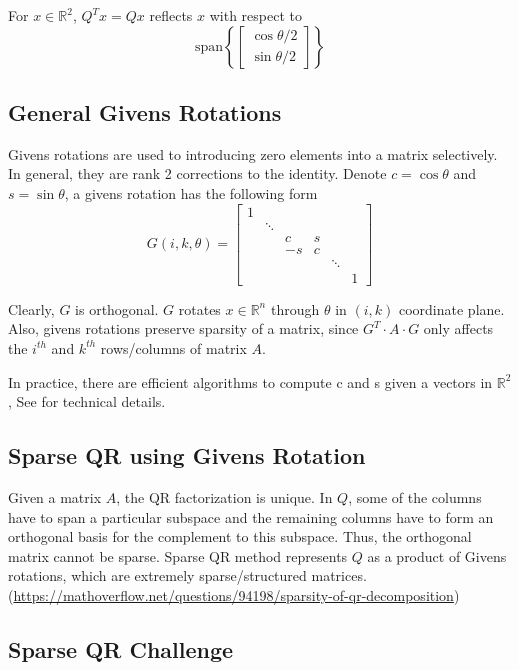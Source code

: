\documentclass[a4paper]{article}
\newcommand{\R}{\mathbb{R}}
\begin{document}
For $x \in \R^2$, $Q^Tx = Qx$ reflects $x$ with respect to 
$$\text{span}\left \{\begin{bmatrix}
    \cos\theta/2 \\
    \sin\theta/2
\end{bmatrix}\right \}$$


\subsection{General Givens Rotations}

Givens rotations are used to introducing zero elements into a matrix selectively. In general, they are rank 2 corrections to the identity. Denote $c= \cos\theta$ and $s = \sin\theta$, a givens rotation has the following form
\[G(i,k, \theta) = \begin{bmatrix}
1 &          &    &   &      &   \\
  &  \ddots  &    &   &      &   \\
  &          & c  & s &      &   \\
  &          & -s & c &      &   \\
  &          &    &   &\ddots&   \\
  &          &    &   &      & 1 
\end{bmatrix}\] 

Clearly, $G$ is orthogonal. $G$ rotates $x\in \R^n$ through $\theta$ in $(i,k)$ coordinate plane. Also, givens rotations preserve sparsity of a matrix, since $G^{T} \cdot A \cdot G$ only affects the $i^{th}$ and $k^{th}$ rows/columns of matrix $A$.

In practice, there are efficient algorithms to compute c and s given a vectors in $\R^2$, See \cite{MatrixComputations} for technical details.


\subsection{Sparse QR using Givens Rotation}

Given a matrix $A$, the QR factorization is unique. In $Q$, some of the columns have to span a particular subspace and the remaining columns have to form an orthogonal basis for the complement to this subspace. Thus, the orthogonal matrix cannot be sparse. Sparse QR method represents $Q$ as a product of Givens rotations, which are extremely sparse/structured matrices.(\url{https://mathoverflow.net/questions/94198/sparsity-of-qr-decomposition})\cite{SparseQR}

\subsection{Sparse QR Challenge}
\end{document}
